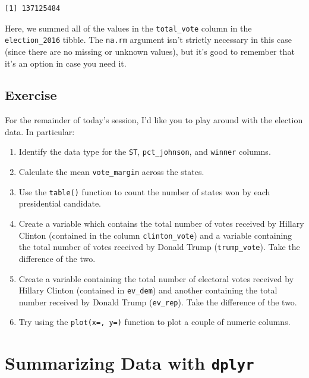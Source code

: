 \documentclass[
  letterpaper,
]{book}
\providecommand{\tightlist}{%
  \setlength{\itemsep}{0pt}\setlength{\parskip}{0pt}}\usepackage{longtable,booktabs,array}
\begin{document}
\begin{verbatim}
[1] 137125484
\end{verbatim}

Here, we summed all of the values in the \texttt{total\_vote} column in
the \texttt{election\_2016} tibble. The \texttt{na.rm} argument isn't
strictly necessary in this case (since there are no missing or unknown
values), but it's good to remember that it's an option in case you need
it.

\hypertarget{exercise}{%
\section{Exercise}\label{exercise}}

For the remainder of today's session, I'd like you to play around with
the election data. In particular:

\begin{enumerate}
\def\labelenumi{\arabic{enumi}.}
\tightlist
\item
  Identify the data type for the \texttt{ST}, \texttt{pct\_johnson}, and
  \texttt{winner} columns.
\item
  Calculate the mean \texttt{vote\_margin} across the states.
\item
  Use the \texttt{table()} function to count the number of states won by
  each presidential candidate.
\item
  Create a variable which contains the total number of votes received by
  Hillary Clinton (contained in the column \texttt{clinton\_vote}) and a
  variable containing the total number of votes received by Donald Trump
  (\texttt{trump\_vote}). Take the difference of the two.
\item
  Create a variable containing the total number of electoral votes
  received by Hillary Clinton (contained in \texttt{ev\_dem}) and
  another containing the total number received by Donald Trump
  (\texttt{ev\_rep}). Take the difference of the two.
\item
  Try using the \texttt{plot(x=,\ y=)} function to plot a couple of
  numeric columns.
\end{enumerate}


\hypertarget{summarizing-data-with-dplyr}{%
\chapter{\texorpdfstring{Summarizing Data with
\texttt{dplyr}}{Summarizing Data with dplyr}}\label{summarizing-data-with-dplyr}}
\end{document}
